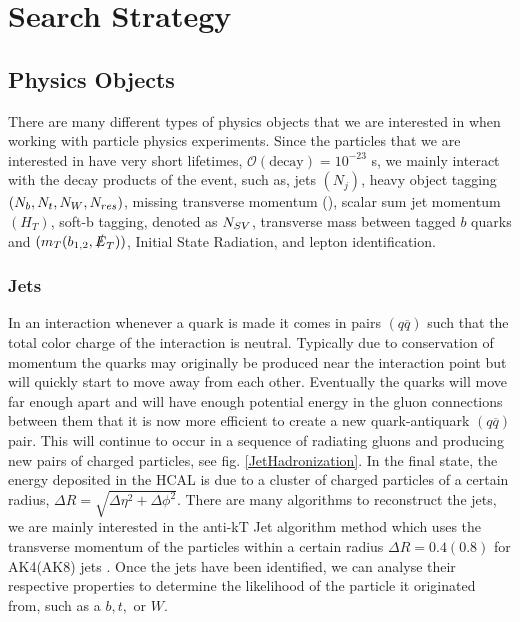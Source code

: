 \chapter{Search Strategy}
\label{ch:SearchStrategy}

\section{Physics Objects}\label{PhysObj}
There are many different types of physics objects that we are interested in when working with particle physics experiments. Since the particles that we are interested in have very short lifetimes, $\mathcal{O}(\text{decay})=10^{-23}$ s, we mainly interact with the decay products of the event, such as, jets $(N_j)$, heavy object tagging $(N_{b}, N_{t}, N_{W}, N_{res})$, missing transverse momentum (\met), scalar sum jet momentum $(H_T)$, soft-b tagging, denoted as $N_{SV}$, transverse mass between tagged $b$ quarks and \met{} $(m_T(b_{1,2}, \slashed{E}_{T}))$, Initial State Radiation, and lepton identification.

\subsection{Jets}\label{Jets}
In an interaction whenever a quark is made it comes in pairs $(q\overline{q})$ such that the total color charge of the interaction is neutral. Typically due to conservation of momentum the quarks may originally be produced near the interaction point but will quickly start to move away from each other. Eventually the quarks will move far enough apart and will have enough potential energy in the gluon connections between them that it is now more efficient to create a new quark-antiquark $(q\overline{q})$ pair. This will continue to occur in a sequence of radiating gluons and producing new pairs of charged particles, see fig. \ref{JetHadronization}. In the final state, the energy deposited in the HCAL is due to a cluster of charged particles of a certain radius, $\Delta R=\sqrt{\Delta\eta^2+\Delta\phi^2}$. There are many algorithms to reconstruct the jets, we are mainly interested in the anti-kT Jet algorithm \cite{cacciari_anti-ktjet_2008} method which uses the transverse momentum of the particles within a certain radius $\Delta R = 0.4 (0.8)$ for AK4(AK8) jets \cite{noauthor_jetid_nodate, noauthor_jec_nodate}. Once the jets have been identified, we can analyse their respective properties to determine the likelihood of the particle it originated from, such as a $b, t, \text{ or } W$. 

